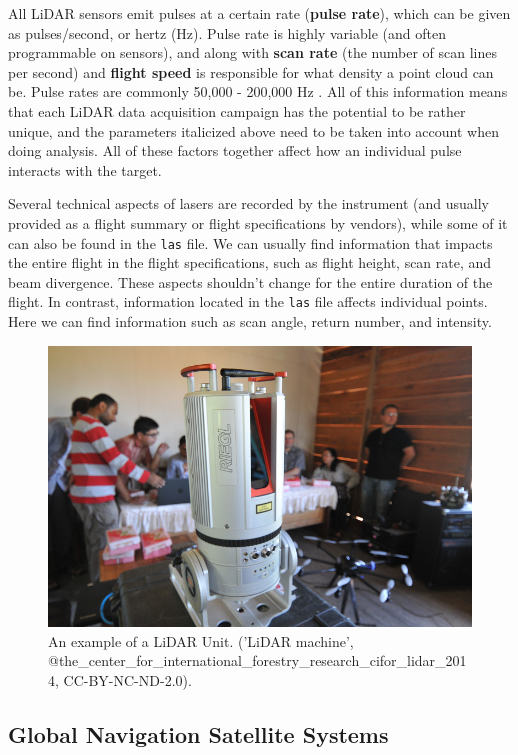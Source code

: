 \documentclass[
]{book}
\begin{document}
All LiDAR sensors emit pulses at a certain rate (\textbf{pulse rate}), which can be given as pulses/second, or hertz (Hz). Pulse rate is highly variable (and often programmable on sensors), and along with \textbf{scan rate} (the number of scan lines per second) and \textbf{flight speed} is responsible for what density a point cloud can be. Pulse rates are commonly 50,000 - 200,000 Hz \citep{white_best_2013}. All of this information means that each LiDAR data acquisition campaign has the potential to be rather unique, and the parameters italicized above need to be taken into account when doing analysis. All of these factors together affect how an individual pulse interacts with the target.

Several technical aspects of lasers are recorded by the instrument (and usually provided as a flight summary or flight specifications by vendors), while some of it can also be found in the \texttt{las} file. We can usually find information that impacts the entire flight in the flight specifications, such as flight height, scan rate, and beam divergence. These aspects shouldn't change for the entire duration of the flight. In contrast, information located in the \texttt{las} file affects individual points. Here we can find information such as scan angle, return number, and intensity.

\begin{figure}
\includegraphics[width=0.7\linewidth]{images/15-LiDAR-Unit} \caption{An example of a LiDAR Unit. ('LiDAR machine', @the_center_for_international_forestry_research_cifor_lidar_2014, CC-BY-NC-ND-2.0).}\label{fig:15-LiDAR-Unit}
\end{figure}

\hypertarget{global-navigation-satellite-systems-1}{%
\subsection{Global Navigation Satellite Systems}\label{global-navigation-satellite-systems-1}}
\end{document}
